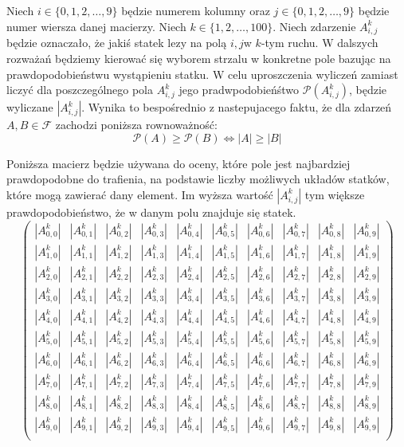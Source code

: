 \documentclass[magisterska]{pracadypl}
\begin{document}
Niech $i \in \{0,1,2,\ldots, 9\}$ będzie numerem kolumny oraz  $j \in \{0,1,2,\ldots, 9\}$ będzie numer wiersza danej macierzy. Niech $k \in \{1,2,\ldots, 100\}$. Niech zdarzenie $A_{i,j}^k$ będzie oznaczało, że jakiś statek lezy na polą $i,j$w $k$-tym ruchu.
\newline
W dalszych rozważań będziemy kierować się wyborem strzalu w konkretne pole bazując na prawdopodobieństwu wystąpieniu statku. W celu uproszczenia wyliczeń zamiast liczyć dla poszczególnego pola $A_{i,j}^{k}$ jego pradwpodobieńśtwo $\mathcal{P}(A_{i,j}^{k})$, będzie wyliczane $|A_{i,j}^{k}|$. Wynika to bespośrednio z nastepujacego faktu, że dla zdarzeń $A,B \in \mathcal{F}$ zachodzi poniższa rownoważność:
$$ \mathcal{P}(A)\geq \mathcal{P}(B)\Leftrightarrow |A|\geq |B|$$


Poniższa macierz będzie używana do oceny, które pole jest najbardziej prawdopodobne do trafienia, na podstawie liczby możliwych układów statków, które mogą zawierać dany element. Im wyższa wartość $|A_{i,j}^k|$  tym większe prawdopodobieństwo, że w danym polu znajduje się statek. 
$$
\begin{pmatrix}
|A_{0,0}^{k}| & |A_{0,1}^{k}| & |A_{0,2}^{k}| & |A_{0,3}^{k}| & |A_{0,4}^{k}| & |A_{0,5}^{k}| & |A_{0,6}^{k}| & |A_{0,7}^{k}| & |A_{0,8}^{k}| & |A_{0,9}^{k}| \\
|A_{1,0}^{k}| & |A_{1,1}^{k}| & |A_{1,2}^{k}| & |A_{1,3}^{k}| & |A_{1,4}^{k}| & |A_{1,5}^{k}| & |A_{1,6}^{k}| & |A_{1,7}^{k}| & |A_{1,8}^{k}| & |A_{1,9}^{k}| \\
|A_{2,0}^{k}| & |A_{2,1}^{k}| & |A_{2,2}^{k}| & |A_{2,3}^{k}| & |A_{2,4}^{k}| & |A_{2,5}^{k}| & |A_{2,6}^{k}| & |A_{2,7}^{k}| & |A_{2,8}^{k}| & |A_{2,9}^{k}| \\
|A_{3,0}^{k}| & |A_{3,1}^{k}| & |A_{3,2}^{k}| & |A_{3,3}^{k}| & |A_{3,4}^{k}| & |A_{3,5}^{k}| & |A_{3,6}^{k}| & |A_{3,7}^{k}| & |A_{3,8}^{k}| & |A_{3,9}^{k}| \\
|A_{4,0}^{k}| & |A_{4,1}^{k}| & |A_{4,2}^{k}| & |A_{4,3}^{k}| & |A_{4,4}^{k}| & |A_{4,5}^{k}| & |A_{4,6}^{k}| & |A_{4,7}^{k}| & |A_{4,8}^{k}| & |A_{4,9}^{k}| \\
|A_{5,0}^{k}| & |A_{5,1}^{k}| & |A_{5,2}^{k}| & |A_{5,3}^{k}| & |A_{5,4}^{k}| & |A_{5,5}^{k}| & |A_{5,6}^{k}| & |A_{5,7}^{k}| & |A_{5,8}^{k}| & |A_{5,9}^{k}| \\
|A_{6,0}^{k}| & |A_{6,1}^{k}| & |A_{6,2}^{k}| & |A_{6,3}^{k}| & |A_{6,4}^{k}| & |A_{6,5}^{k}| & |A_{6,6}^{k}| & |A_{6,7}^{k}| & |A_{6,8}^{k}| & |A_{6,9}^{k}| \\
|A_{7,0}^{k}| & |A_{7,1}^{k}| & |A_{7,2}^{k}| & |A_{7,3}^{k}| & |A_{7,4}^{k}| & |A_{7,5}^{k}| & |A_{7,6}^{k}| & |A_{7,7}^{k}| & |A_{7,8}^{k}| & |A_{7,9}^{k}| \\
|A_{8,0}^{k}| & |A_{8,1}^{k}| & |A_{8,2}^{k}| & |A_{8,3}^{k}| & |A_{8,4}^{k}| & |A_{8,5}^{k}| & |A_{8,6}^{k}| & |A_{8,7}^{k}| & |A_{8,8}^{k}| & |A_{8,9}^{k}| \\
|A_{9,0}^{k}| & |A_{9,1}^{k}| & |A_{9,2}^{k}| & |A_{9,3}^{k}| & |A_{9,4}^{k}| & |A_{9,5}^{k}| & |A_{9,6}^{k}| & |A_{9,7}^{k}| & |A_{9,8}^{k}| & |A_{9,9}^{k}| \\
\end{pmatrix}
$$
\end{document}
